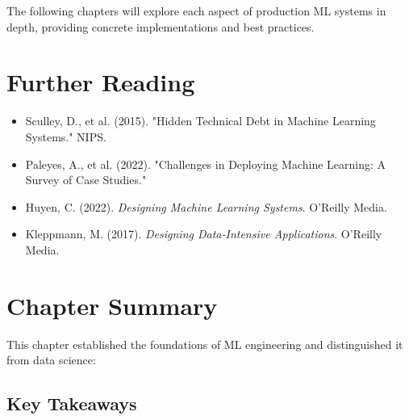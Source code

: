 The following chapters will explore each aspect of production ML systems in depth, providing concrete implementations and best practices.

\section{Further Reading}

\begin{itemize}
    \item Sculley, D., et al. (2015). "Hidden Technical Debt in Machine Learning Systems." NIPS.
    \item Paleyes, A., et al. (2022). "Challenges in Deploying Machine Learning: A Survey of Case Studies."
    \item Huyen, C. (2022). \textit{Designing Machine Learning Systems}. O'Reilly Media.
    \item Kleppmann, M. (2017). \textit{Designing Data-Intensive Applications}. O'Reilly Media.
\end{itemize}

\section{Chapter Summary}

This chapter established the foundations of ML engineering and distinguished it from data science:

\subsection*{Key Takeaways}

